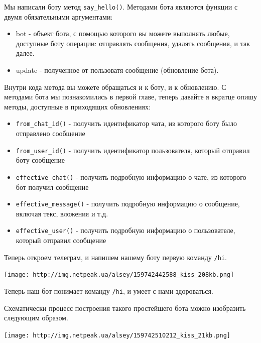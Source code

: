 \documentclass[
]{book}
\providecommand{\tightlist}{%
  \setlength{\itemsep}{0pt}\setlength{\parskip}{0pt}}
\begin{document}
Мы написали боту метод \texttt{say\_hello()}. Методами бота являются функции с двумя обязательными аргументами:

\begin{itemize}
\tightlist
\item
  bot - объект бота, с помощью которого вы можете выполнять любые, доступные боту операции: отправлять сообщения, удалять сообщения, и так далее.
\item
  update - полученное от пользоватя сообщение (обновление бота).
\end{itemize}

Внутри кода метода вы можете обращаться и к боту, и к обновлению. С методами бота мы познакомились в первой главе, теперь давайте я вкратце опишу методы, доступные в приходящих обновлениях:

\begin{itemize}
\tightlist
\item
  \texttt{from\_chat\_id()} - получить идентификатор чата, из которого боту было отправлено сообщение
\item
  \texttt{from\_user\_id()} - получить идентификатор пользователя, который отправил боту сообщение
\item
  \texttt{effective\_chat()} - получить подробную информацию о чате, из которого бот получил сообщение
\item
  \texttt{effective\_message()} - получить подробную информацию о сообщение, включая текс, вложения и т.д.
\item
  \texttt{effective\_user()} - получить подробную информацию о пользователе, который отправил сообщение
\end{itemize}

Теперь откроем телеграм, и напишем нашему боту первую команду \texttt{/hi}.

\texttt{[image: http://img.netpeak.ua/alsey/159742442588\_kiss\_208kb.png]}

Теперь наш бот понимает команду \texttt{/hi}, и умеет с нами здороваться.

Схематически процесс построения такого простейшего бота можно изобразить следующим образом.

\texttt{[image: http://img.netpeak.ua/alsey/159742510212\_kiss\_21kb.png]}
\end{document}
